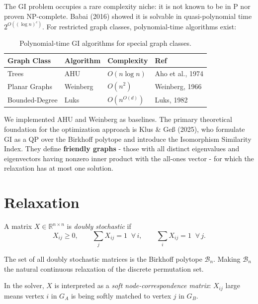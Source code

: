 \documentclass[12pt,a4paper]{article}
\begin{document}
The GI problem occupies a rare complexity niche: it is not known to be in P nor
proven NP-complete.  Babai (2016) showed it is solvable in quasi-polynomial
time $2^{O((\log n)^c)}$.  For restricted graph classes, polynomial-time
algorithms exist:

\begin{table}[H]
\centering
\begin{tabular}{@{}llll@{}}
\toprule
\textbf{Graph Class} & \textbf{Algorithm} & \textbf{Complexity} & \textbf{Ref} \\
\midrule
Trees          & AHU            & $O(n \log n)$ & Aho et al., 1974 \\
Planar Graphs  & Weinberg       & $O(n^2)$      & Weinberg, 1966 \\
Bounded-Degree & Luks           & $O(n^{O(d)})$ & Luks, 1982 \\
\bottomrule
\end{tabular}
\caption{Polynomial-time GI algorithms for special graph classes.}
\end{table}

We implemented AHU and Weinberg as baselines.  The primary theoretical
foundation for the optimization approach is Klus \& Ge\ss{} (2025), who
formulate GI as a QP over the Birkhoff polytope and introduce the Isomorphism
Similarity Index.  They define \textbf{friendly graphs} - those with all
distinct eigenvalues and eigenvectors having nonzero inner product with the
all-ones vector - for which the relaxation has at most one solution.

\section{Relaxation}\label{sec:relaxation}

A matrix $X \in \mathbb{R}^{n \times n}$ is \emph{doubly stochastic} if
\begin{equation}
  X_{ij} \geq 0, \qquad
  \sum_j X_{ij} = 1 \;\;\forall\, i, \qquad
  \sum_i X_{ij} = 1 \;\;\forall\, j.
\end{equation}

The set of all doubly stochastic matrices is the Birkhoff polytope
$\mathcal{B}_n$.  Making $\mathcal{B}_n$ the natural continuous
relaxation of the discrete permutation set.

In the solver, $X$ is interpreted as a \emph{soft node-correspondence matrix}:
$X_{ij}$ large means vertex $i$ in $G_A$ is being softly matched to vertex $j$
in $G_B$.
\end{document}
